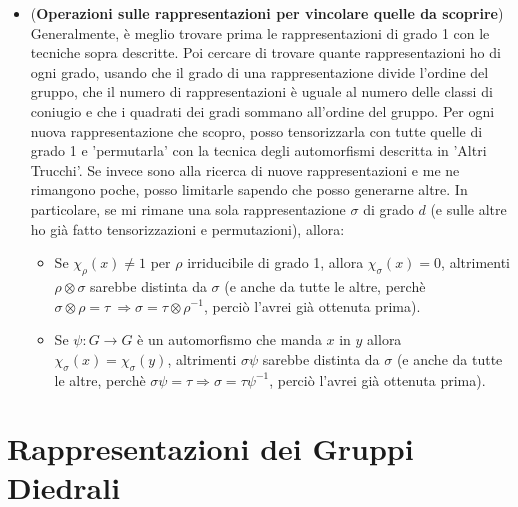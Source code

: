 \documentclass[a4paper,NoNotes,GeneralMath]{stdmdoc}
\begin{document}
\begin{itemize}
		\item ({\bf Operazioni sulle rappresentazioni per vincolare quelle da scoprire})
		Generalmente, è meglio trovare prima le rappresentazioni di grado 1 con le tecniche sopra descritte. Poi cercare di trovare quante rappresentazioni ho di ogni grado, usando che il grado di una rappresentazione divide l'ordine del gruppo, che il numero di rappresentazioni è uguale al numero delle classi di coniugio e che i quadrati dei gradi sommano all'ordine del gruppo.
		Per ogni nuova rappresentazione che scopro, posso tensorizzarla con tutte quelle di grado 1 e 'permutarla' con la tecnica degli automorfismi descritta in 'Altri Trucchi'. Se invece sono alla ricerca di nuove rappresentazioni e me ne rimangono poche, posso limitarle sapendo che posso generarne altre. In particolare, se mi rimane una sola rappresentazione $\sigma$ di grado $d$ (e sulle altre ho già fatto tensorizzazioni e permutazioni), allora:
		\begin{itemize}
			\item Se $\chi_{\rho}(x) \neq 1$ per $\rho$ irriducibile di grado 1, allora $\chi_{\sigma}(x) = 0$, altrimenti $\rho \otimes \sigma$ sarebbe distinta da $\sigma$ (e anche da tutte le altre, perchè $\sigma \otimes \rho = \tau \ \Rightarrow \sigma = \tau \otimes \rho^{-1}$, perciò l'avrei già ottenuta prima).
			\item Se $\psi:G \to G$ è un automorfismo che manda $x$ in $y$ allora $\chi_{\sigma}(x) = \chi_{\sigma}(y)$, altrimenti $\sigma \psi$ sarebbe distinta da $\sigma$ (e anche da tutte le altre, perchè $\sigma\psi = \tau \Rightarrow \sigma = \tau \psi^{-1}$, perciò l'avrei già ottenuta prima).
		\end{itemize}
	\end{itemize}

	\section{Rappresentazioni dei Gruppi Diedrali}
\end{document}
